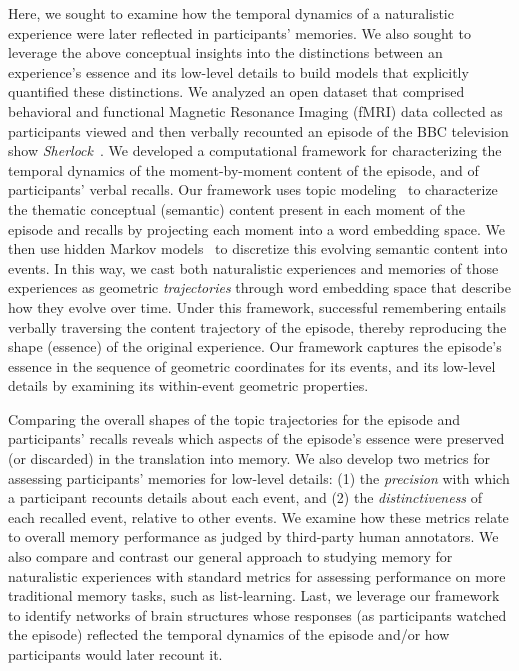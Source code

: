 \documentclass[10pt]{article}
\begin{document}
Here, we sought to examine how the temporal dynamics of a naturalistic experience were later reflected in participants' memories.  We also sought to leverage the above conceptual insights into the distinctions between an experience's essence and its low-level details to build models that explicitly quantified these distinctions.  We analyzed an open dataset that comprised behavioral and functional Magnetic Resonance Imaging (fMRI) data collected as participants viewed and then verbally recounted an episode of the BBC television show \textit{Sherlock}~\citep{ChenEtal17}.  We developed a computational framework for characterizing the temporal dynamics of the moment-by-moment content of the episode, and of participants' verbal recalls.  Our framework uses topic modeling~\citep{BleiEtal03} to characterize the thematic conceptual (semantic) content present in each moment of the episode and recalls by projecting each moment into a word embedding space.  We then use hidden Markov models~\citep{Rabi89, BaldEtal17} to discretize this evolving semantic content into events.  In this way, we cast both naturalistic experiences and memories of those experiences as geometric \textit{trajectories} through word embedding space that describe how they evolve over time. Under this framework, successful remembering entails verbally traversing the content trajectory of the episode, thereby reproducing the shape (essence) of the original experience.  Our framework captures the episode's essence in the sequence of geometric coordinates for its events, and its low-level details by examining its within-event geometric properties.

Comparing the overall shapes of the topic trajectories for the episode and participants' recalls reveals which aspects of the episode's essence were preserved (or discarded) in the translation into memory.  We also develop two metrics for assessing participants' memories for low-level details: (1) the \textit{precision} with which a participant recounts details about each event, and (2) the \textit{distinctiveness} of each recalled event, relative to other events.  We examine how these metrics relate to overall memory performance as judged by third-party human annotators.  We also compare and contrast our general approach to studying memory for naturalistic experiences with standard metrics for assessing performance on more traditional memory tasks, such as list-learning.  Last, we leverage our framework to identify networks of brain structures whose responses (as participants watched the episode) reflected the temporal dynamics of the episode and/or how participants would later recount it.
\end{document}
